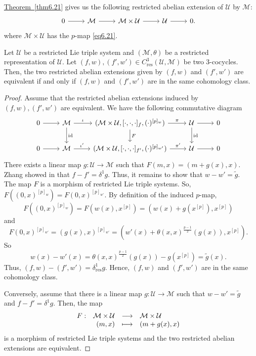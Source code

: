 \documentclass[11pt, twoside]{article}
\begin{document}
\hyperref[thm6.21]{Theorem~\ref*{thm6.21}} gives us the following restricted abelian extension of $\mathcal{U}$ by $\mathcal{M}$: \[\begin{tikzcd}
	0 & \mathcal{M} & {\mathcal{M}\times\mathcal{U}} & {\mathcal{U}} & 0.
	\arrow[from=1-1, to=1-2]
	\arrow[from=1-2, to=1-3]
	\arrow[from=1-3, to=1-4]
	\arrow[from=1-4, to=1-5]
\end{tikzcd}\] where $\mathcal{M}\times\mathcal{U} $ has the $p$-map \eqref{eq6.21}.

\begin{lem}
    Let $\mathcal{U} $ be a restricted Lie triple system and $(\mathcal{M},\theta) $ be a restricted representation of $\mathcal{U}$. Let $(f,w),(f',w')\in C_\mathrm{res}^3(\mathcal{U},\mathcal{M}) $ be two $3$-cocycles. Then, the two restricted abelian extensions given by $(f,w)$ and $(f',w')$ are equivalent if and only if $(f,w)$ and $(f',w')$ are in the same cohomology class.
\end{lem}

\begin{proof}
    Assume that the restricted abelian extensions induced by $(f,w),(f',w') $ are equivalent. We have the following commutative diagram \[\begin{tikzcd}
	0 & \mathcal{M} & (\mathcal{M}\times \mathcal{U},[\cdot,\cdot,\cdot]_{f},(\cdot)^{[p]_w}) & {\mathcal{U}} & 0 \\
	0 & \mathcal{M} & {(\mathcal{M}\times \mathcal{U},[\cdot,\cdot,\cdot]_{f'},(\cdot)^{[p]_{w'}})} & {\mathcal{U}} & 0
	\arrow[from=1-1, to=1-2]
	\arrow["\iota", from=1-2, to=1-3]
	\arrow["{\mathrm{id}}", from=1-2, to=2-2]
	\arrow["\pi", from=1-3, to=1-4]
	\arrow["F", from=1-3, to=2-3]
	\arrow[from=1-4, to=1-5]
	\arrow["{\mathrm{id}}", from=1-4, to=2-4]
	\arrow[from=2-1, to=2-2]
	\arrow["{\iota'}", from=2-2, to=2-3]
	\arrow["{\pi'}", from=2-3, to=2-4]
	\arrow[from=2-4, to=2-5]
\end{tikzcd}\] There exists a linear map $g:\mathcal{U}\to \mathcal{M}$ such that $F(m,x)= (m+g(x),x)$. Zhang showed in \cite{Z14} that $f-f'=\delta^1 g$. Thus, it remains to show that $w-w'=\tilde{g}$. The map $F$ is a morphism of restricted Lie triple systems. So, $F((0,x)^{[p]_w})=F(0,x)^{[p]_{w'}}  $. By definition of the induced $p$-map, $$F((0,x)^{[p]_w})= F(w(x),x^{[p]})= (w(x)+g(x^{[p]}),x^{[p]}) $$ and $$F(0,x)^{[p]_{w'}}=(g(x),x)^{[p]_{w'}}=(w'(x)+\theta(x,x)^\frac{p-1}{2}(g(x)),x^{[p]}) .$$ So $$w(x)-w'(x)=\theta(x,x)^\frac{p-1}{2}(g(x))-g(x^{[p]})=\tilde{g}(x). $$ Thus, $(f,w)-(f',w')=\delta^1_\mathrm{res}g $. Hence, $(f,w)$ and $(f',w')$ are in the same cohomology class.

Conversely, assume that there is a linear map $g:\mathcal{U}\to \mathcal{M}$ such that $w-w'=\tilde{g} $ and $f-f'=\delta^1 g $. Then, the map $$
\begin{array}[t]{lrcl}
F : & \mathcal{M}\times \mathcal{U} &  \longrightarrow & \mathcal{M}\times \mathcal{U} \\
   & (m,x) &  \longmapsto & (m+g(x),x) \end{array}
$$ is a morphism of restricted Lie triple systems and the two restricted abelian extensions are equivalent.
\end{proof}
\end{document}
